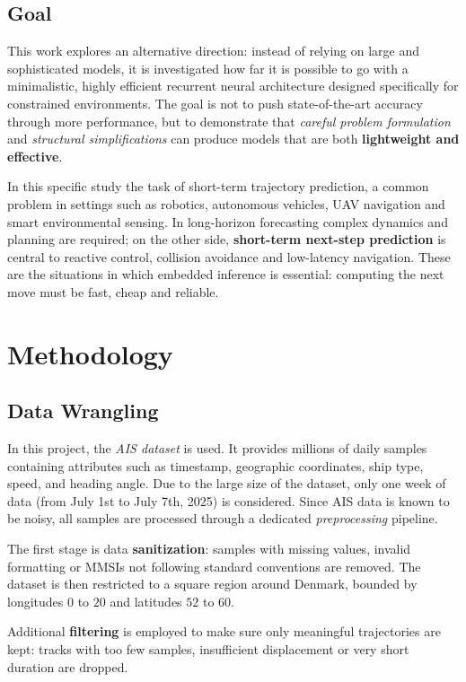 \documentclass{article}
\begin{document}
\subsection{Goal}
This work explores an alternative direction: instead of relying on large and sophisticated models, it is investigated how far it is possible to go with a minimalistic, highly efficient recurrent neural architecture designed specifically for constrained environments. The goal is not to push state-of-the-art accuracy through more performance, but to demonstrate that \textit{careful problem formulation} and \textit{structural simplifications} can produce models that are both \textbf{lightweight and effective}.

In this specific study the task of short-term trajectory prediction, a common problem in settings such as robotics, autonomous vehicles, UAV navigation and smart environmental sensing. In long-horizon forecasting complex dynamics and planning are required; on the other side, \textbf{short-term next-step prediction} is central to reactive control, collision avoidance and low-latency navigation. These are the situations in which embedded inference is essential: computing the next move must be fast, cheap and reliable.

\section{Methodology}
\label{sec:method}

\subsection{Data Wrangling}\label{WRANG}
In this project, the \textit{AIS dataset} \cite{bAIS} is used. It provides millions of daily samples containing attributes such as timestamp, geographic coordinates, ship type, speed, and heading angle. Due to the large size of the dataset, only one week of data (from July 1st to July 7th, 2025) is considered. Since AIS data is known to be noisy, all samples are processed through a dedicated \textit{preprocessing} pipeline.

The first stage is data \textbf{sanitization}: samples with missing values, invalid formatting or MMSIs not following standard conventions are removed. The dataset is then restricted to a square region around Denmark, bounded by longitudes $0$ to $20$ and latitudes $52$ to $60$.

Additional \textbf{filtering} is employed to make sure only meaningful trajectories are kept: tracks with too few samples, insufficient displacement or very short duration are dropped.
\end{document}

